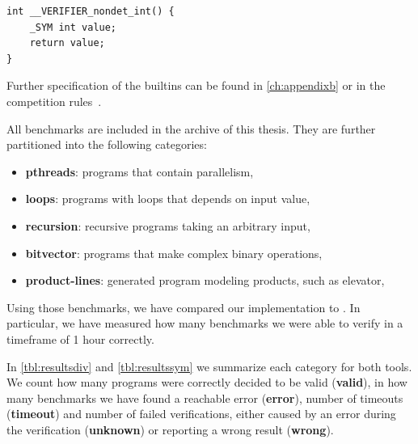 \begin{verbatim}
int __VERIFIER_nondet_int() {
    _SYM int value;
    return value;
}
\end{verbatim}
Further specification of the \svcomp builtins can be found in
\autoref{ch:appendixb} or in the competition rules~\cite{svcomp}.

All benchmarks are included in the archive of this thesis. They are further
partitioned into the following categories:
\begin{itemize}
    \item \textbf{pthreads}: programs that contain parallelism,
    \item \textbf{loops}: programs with loops that depends on input value,
    \item \textbf{recursion}: recursive programs taking an arbitrary input,
    \item \textbf{bitvector}: programs that make complex binary operations,
    \item \textbf{product-lines}: generated program modeling products, such as
        elevator,
\end{itemize}

Using those benchmarks, we have compared our implementation to \SymDIVINE. In
particular, we have measured how many benchmarks we were able to verify in a timeframe of 1 hour correctly.

In \autoref{tbl:resultsdiv} and \autoref{tbl:resultssym} we summarize each
category for both tools. We count how many programs were correctly decided to be
valid (\textbf{valid}), in how many benchmarks we have found a reachable error
(\textbf{error}), number of timeouts (\textbf{timeout}) and number of failed
verifications, either caused by an error during the verification (\textbf{unknown})
or reporting a wrong result (\textbf{wrong}).

